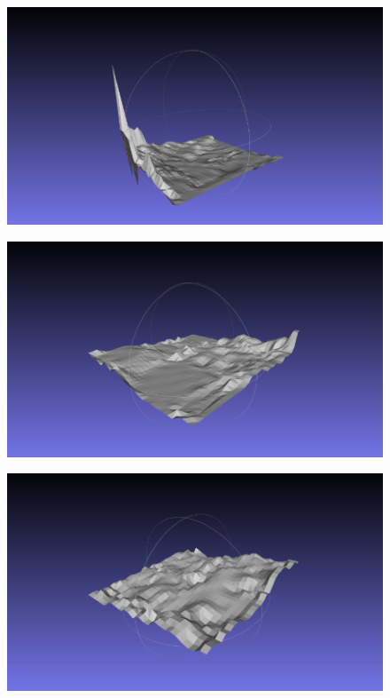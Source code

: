 \begin{figure}[htbp]
\begin{minipage}[b]{0.49\linewidth}
      \label{fig:spline3}
    \end{minipage}
    \begin{minipage}[b]{0.49\linewidth}
      \centering
      \includegraphics[keepaspectratio, scale=0.45]{images/spline4.png}
      \label{fig:spline4}
    \end{minipage}
    \begin{minipage}[b]{0.49\linewidth}
        \centering
        \includegraphics[keepaspectratio, scale=0.44]{images/spline5.png}
        \label{fig:spline5}
      \end{minipage}
      \begin{minipage}[b]{0.49\linewidth}
        \centering
        \includegraphics[keepaspectratio, scale=0.45]{images/spline6.png}

\end{minipage}
\end{figure}
